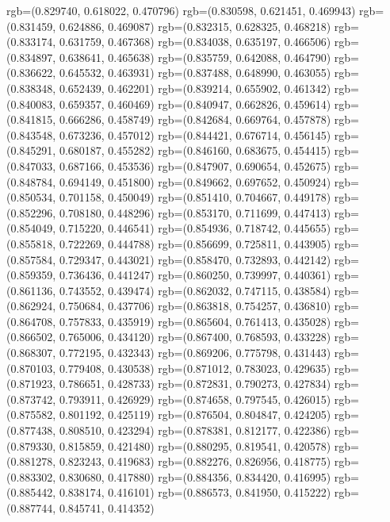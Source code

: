 {{{					rgb=(0.829740, 0.618022, 0.470796)
					rgb=(0.830598, 0.621451, 0.469943)
					rgb=(0.831459, 0.624886, 0.469087)
					rgb=(0.832315, 0.628325, 0.468218)
					rgb=(0.833174, 0.631759, 0.467368)
					rgb=(0.834038, 0.635197, 0.466506)
					rgb=(0.834897, 0.638641, 0.465638)
					rgb=(0.835759, 0.642088, 0.464790)
					rgb=(0.836622, 0.645532, 0.463931)
					rgb=(0.837488, 0.648990, 0.463055)
					rgb=(0.838348, 0.652439, 0.462201)
					rgb=(0.839214, 0.655902, 0.461342)
					rgb=(0.840083, 0.659357, 0.460469)
					rgb=(0.840947, 0.662826, 0.459614)
					rgb=(0.841815, 0.666286, 0.458749)
					rgb=(0.842684, 0.669764, 0.457878)
					rgb=(0.843548, 0.673236, 0.457012)
					rgb=(0.844421, 0.676714, 0.456145)
					rgb=(0.845291, 0.680187, 0.455282)
					rgb=(0.846160, 0.683675, 0.454415)
					rgb=(0.847033, 0.687166, 0.453536)
					rgb=(0.847907, 0.690654, 0.452675)
					rgb=(0.848784, 0.694149, 0.451800)
					rgb=(0.849662, 0.697652, 0.450924)
					rgb=(0.850534, 0.701158, 0.450049)
					rgb=(0.851410, 0.704667, 0.449178)
					rgb=(0.852296, 0.708180, 0.448296)
					rgb=(0.853170, 0.711699, 0.447413)
					rgb=(0.854049, 0.715220, 0.446541)
					rgb=(0.854936, 0.718742, 0.445655)
					rgb=(0.855818, 0.722269, 0.444788)
					rgb=(0.856699, 0.725811, 0.443905)
					rgb=(0.857584, 0.729347, 0.443021)
					rgb=(0.858470, 0.732893, 0.442142)
					rgb=(0.859359, 0.736436, 0.441247)
					rgb=(0.860250, 0.739997, 0.440361)
					rgb=(0.861136, 0.743552, 0.439474)
					rgb=(0.862032, 0.747115, 0.438584)
					rgb=(0.862924, 0.750684, 0.437706)
					rgb=(0.863818, 0.754257, 0.436810)
					rgb=(0.864708, 0.757833, 0.435919)
					rgb=(0.865604, 0.761413, 0.435028)
					rgb=(0.866502, 0.765006, 0.434120)
					rgb=(0.867400, 0.768593, 0.433228)
					rgb=(0.868307, 0.772195, 0.432343)
					rgb=(0.869206, 0.775798, 0.431443)
					rgb=(0.870103, 0.779408, 0.430538)
					rgb=(0.871012, 0.783023, 0.429635)
					rgb=(0.871923, 0.786651, 0.428733)
					rgb=(0.872831, 0.790273, 0.427834)
					rgb=(0.873742, 0.793911, 0.426929)
					rgb=(0.874658, 0.797545, 0.426015)
					rgb=(0.875582, 0.801192, 0.425119)
					rgb=(0.876504, 0.804847, 0.424205)
					rgb=(0.877438, 0.808510, 0.423294)
					rgb=(0.878381, 0.812177, 0.422386)
					rgb=(0.879330, 0.815859, 0.421480)
					rgb=(0.880295, 0.819541, 0.420578)
					rgb=(0.881278, 0.823243, 0.419683)
					rgb=(0.882276, 0.826956, 0.418775)
					rgb=(0.883302, 0.830680, 0.417880)
					rgb=(0.884356, 0.834420, 0.416995)
					rgb=(0.885442, 0.838174, 0.416101)
					rgb=(0.886573, 0.841950, 0.415222)
					rgb=(0.887744, 0.845741, 0.414352)
}}}
